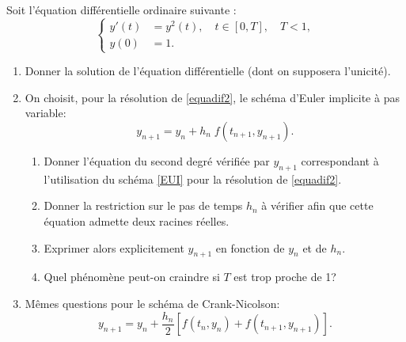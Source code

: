\documentclass[a4paper,12pt,reqno]{amsart}
\begin{document}
\begin{exo}

  Soit l'équation différentielle ordinaire suivante :
  \begin{equation}
    \label{equadif2}
    \left\{
      \begin{aligned}
        y'(t) &= y^2(t), \quad t \in [0,T], \quad T<1,\\
        y(0)  &= 1.
      \end{aligned}
    \right.
  \end{equation}
  \begin{enumerate}
    \item Donner la solution de l'équation différentielle (dont on supposera l'unicité).
    \item On choisit, pour la résolution de \eqref{equadif2}, le schéma d'Euler implicite à pas variable:
      \begin{equation}
        \label{EUI}
        y_{n+1} = y_n+ h_n \; f(t_{n+1},y_{n+1}).
      \end{equation}
      \begin{enumerate}
        \item Donner l'équation du second degré vérifiée par $y_{n+1}$ correspondant à l'utilisation du schéma \eqref{EUI} pour la résolution de \eqref{equadif2}.
        \item Donner la restriction sur le pas de temps $h_n$ à vérifier afin que cette équation admette deux racines réelles.
        \item Exprimer alors explicitement $y_{n+1}$ en fonction de $y_n$ et de $h_n$.
        \item Quel phénomène peut-on craindre si $T$ est trop proche de 1?
      \end{enumerate}
    \item Mêmes questions pour le schéma de Crank-Nicolson:
      \[
        y_{n+1}=y_n+ \frac{h_n}{2} \left[ f(t_n,y_n)+f(t_{n+1},y_{n+1}) \right].
      \]
  \end{enumerate}
\end{exo}
\end{document}
